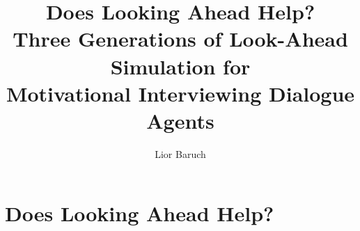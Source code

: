 \documentclass[11pt,a4paper]{report}
\title{\textbf{Does Looking Ahead Help?}\\[2pt]
       \large Three Generations of Look-Ahead Simulation for\\
       Motivational Interviewing Dialogue Agents}
\author{Lior Baruch}
\date{}
\begin{document}
\maketitle

\chapter{Does Looking Ahead Help?}
\label{ch:lookahead}














\end{document}
